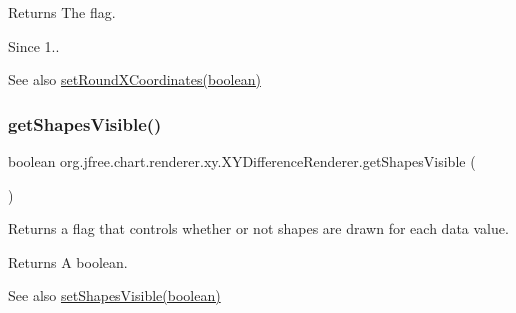 \begin{DoxyReturn}{Returns}
The flag.
\end{DoxyReturn}
\begin{DoxySince}{Since}
1..
\end{DoxySince}
\begin{DoxySeeAlso}{See also}
\mbox{\hyperlink{classorg_1_1jfree_1_1chart_1_1renderer_1_1xy_1_1_x_y_difference_renderer_add148660ff1686d7228fd9a525ccb23c}{set\+Round\+X\+Coordinates(boolean)}} 
\end{DoxySeeAlso}
\mbox{\label{classorg_1_1jfree_1_1chart_1_1renderer_1_1xy_1_1_x_y_difference_renderer_a29eb3619b03bae151989da762c41d2c9}} 
\subsubsection{\texorpdfstring{get\+Shapes\+Visible()}{getShapesVisible()}}
{\footnotesize\ttfamily boolean org.\+jfree.\+chart.\+renderer.\+xy.\+X\+Y\+Difference\+Renderer.\+get\+Shapes\+Visible (\begin{DoxyParamCaption}{ }\end{DoxyParamCaption})}

Returns a flag that controls whether or not shapes are drawn for each data value.

\begin{DoxyReturn}{Returns}
A boolean.
\end{DoxyReturn}
\begin{DoxySeeAlso}{See also}
\mbox{\hyperlink{classorg_1_1jfree_1_1chart_1_1renderer_1_1xy_1_1_x_y_difference_renderer_a19d0ac0748a1b8eab687aac2f6a352c1}{set\+Shapes\+Visible(boolean)}} 
\end{DoxySeeAlso}
\mbox{\label{classorg_1_1jfree_1_1chart_1_1renderer_1_1xy_1_1_x_y_difference_renderer_a321b09ac31585be554651722cbfc5999}} 

